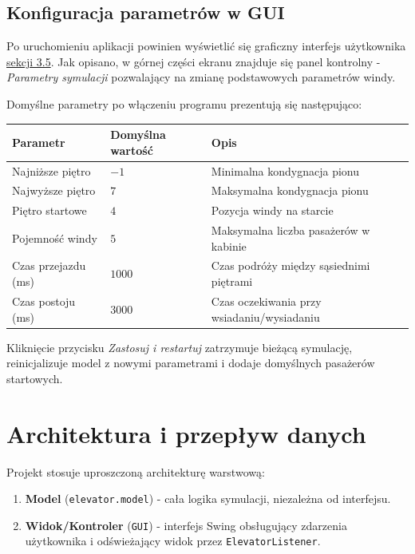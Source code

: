 \documentclass[12pt, a4paper]{article}
\begin{document}
\subsection{Konfiguracja parametrów w GUI}

Po uruchomieniu aplikacji powinien wyświetlić się graficzny interfejs użytkownika \href{subsec:gui}{sekcji 3.5}. Jak opisano, w górnej części ekranu znajduje 
się panel kontrolny - \emph{Parametry symulacji} pozwalający na zmianę podstawowych parametrów windy.

Domyślne parametry po włączeniu programu prezentują się następująco:

\begin{center}
\begin{tabular}{lll}
  \toprule
  \textbf{Parametr} & \textbf{Domyślna wartość} & \textbf{Opis} \\
  \midrule
  Najniższe piętro       & $-1$   & Minimalna kondygnacja pionu \\
  Najwyższe piętro       & $7$    & Maksymalna kondygnacja pionu \\
  Piętro startowe        & $4$    & Pozycja windy na starcie \\
  Pojemność windy        & $5$    & Maksymalna liczba pasażerów w kabinie \\
  Czas przejazdu (ms)    & $1000$ & Czas podróży między sąsiednimi piętrami \\
  Czas postoju (ms)      & $3000$ & Czas oczekiwania przy wsiadaniu/wysiadaniu \\
  \bottomrule
\end{tabular}
\end{center}

Kliknięcie przycisku \emph{Zastosuj i restartuj} zatrzymuje bieżącą symulację, reinicjalizuje model z nowymi parametrami i dodaje domyślnych pasażerów startowych.

\newpage

\section{Architektura i przepływ danych}
\label{sec:architektura}

Projekt stosuje uproszczoną architekturę warstwową:

\begin{enumerate}
  \item \textbf{Model} (\texttt{elevator.model}) - cała logika symulacji, niezależna od interfejsu.
  \item \textbf{Widok/Kontroler} (\texttt{GUI}) - interfejs Swing obsługujący zdarzenia użytkownika i odświeżający widok przez \texttt{ElevatorListener}.
\end{enumerate}
\end{document}
